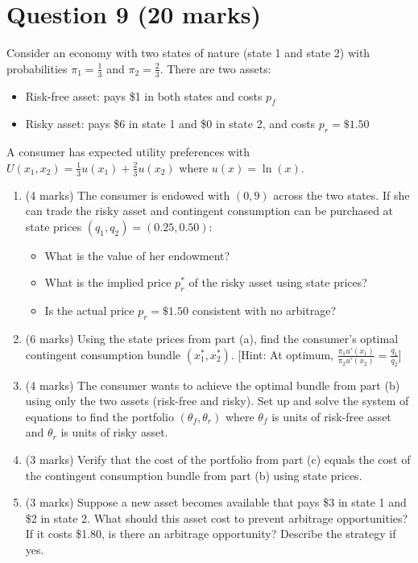 \documentclass[12pt]{article}
\begin{document}
\bigskip

\newpage
\section*{Question 9 (20 marks)}

Consider an economy with two states of nature (state 1 and state 2) with probabilities $\pi_1 = \frac{1}{3}$ and $\pi_2 = \frac{2}{3}$. There are two assets:
\begin{itemize}
\item Risk-free asset: pays \$1 in both states and costs $p_f$
\item Risky asset: pays \$6 in state 1 and \$0 in state 2, and costs $p_r = \$1.50$
\end{itemize}

A consumer has expected utility preferences with $U(x_1, x_2) = \frac{1}{3}u(x_1) + \frac{2}{3}u(x_2)$ where $u(x) = \ln(x)$.

\begin{enumerate}[label=(\alph*)]
\item (4 marks) The consumer is endowed with $(0, 9)$ across the two states. If she can trade the risky asset and contingent consumption can be purchased at state prices $(q_1, q_2) = (0.25, 0.50)$:
\begin{itemize}
\item What is the value of her endowment?
\item What is the implied price $p_r^*$ of the risky asset using state prices?
\item Is the actual price $p_r = \$1.50$ consistent with no arbitrage?
\end{itemize}

\item (6 marks) Using the state prices from part (a), find the consumer's optimal contingent consumption bundle $(x_1^*, x_2^*)$. [Hint: At optimum, $\frac{\pi_1 u'(x_1)}{\pi_2 u'(x_2)} = \frac{q_1}{q_2}$]

\item (4 marks) The consumer wants to achieve the optimal bundle from part (b) using only the two assets (risk-free and risky). Set up and solve the system of equations to find the portfolio $(\theta_f, \theta_r)$ where $\theta_f$ is units of risk-free asset and $\theta_r$ is units of risky asset.

\item (3 marks) Verify that the cost of the portfolio from part (c) equals the cost of the contingent consumption bundle from part (b) using state prices.

\item (3 marks) Suppose a new asset becomes available that pays \$3 in state 1 and \$2 in state 2. What should this asset cost to prevent arbitrage opportunities? If it costs \$1.80, is there an arbitrage opportunity? Describe the strategy if yes.
\end{enumerate}
\end{document}
